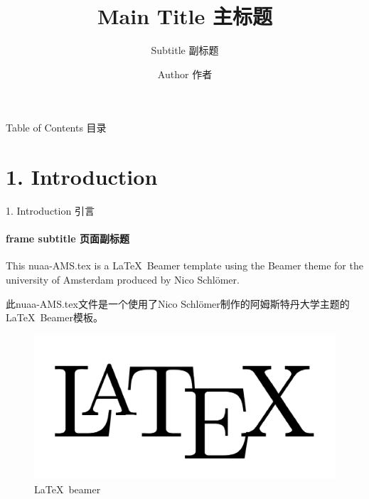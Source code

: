 \documentclass[CJKutf8,compress]{beamer}
\begin{document}
\begin{CJK*}{UTF8}{gkai} %

  \title{Main Title 主标题}
  \subtitle{Subtitle 副标题} %
  \author{Author 作者}

  \begin{frame}
    \titlepage
  \end{frame} %
  
  \begin{frame}{Table of Contents 目录}
    \tableofcontents
  \end{frame} %
  
  \section{1. Introduction}
  \label{Sec:introduction}
  \begin{frame}{1. Introduction 引言}
    \framesubtitle{frame subtitle 页面副标题}
    This nuaa-AMS.tex is a \LaTeX \ Beamer template using the Beamer theme for the university of Amsterdam\cite{AMSTheme} produced by Nico Schlömer.

    \bigskip

    此nuaa-AMS.tex文件是一个使用了Nico Schlömer制作的阿姆斯特丹大学主题\cite{AMSTheme}的\LaTeX \ Beamer模板。

    \begin{figure}
      \begin{center}
        \includegraphics[scale=0.1]{latex.png}
      \end{center}
      \caption{\LaTeX \ beamer}
      \label{Fig:latex_beamer}
    \end{figure}
  \end{frame} %


\end{CJK*}
\end{document}

